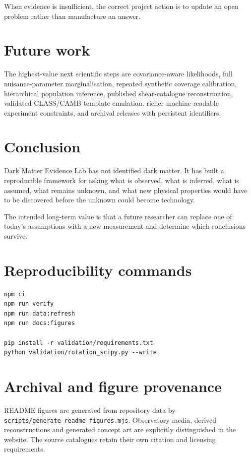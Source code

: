 \documentclass[11pt,a4paper]{article}
\begin{document}
When evidence is insufficient, the correct project action is to update an open problem rather than manufacture an answer.

\section{Future work}
The highest-value next scientific steps are covariance-aware likelihoods, full nuisance-parameter marginalisation, repeated synthetic coverage calibration, hierarchical population inference, published shear-catalogue reconstruction, validated CLASS/CAMB template emulation, richer machine-readable experiment constraints, and archival releases with persistent identifiers.

\section{Conclusion}
Dark Matter Evidence Lab has not identified dark matter. It has built a reproducible framework for asking what is observed, what is inferred, what is assumed, what remains unknown, and what new physical properties would have to be discovered before the unknown could become technology.

The intended long-term value is that a future researcher can replace one of today's assumptions with a new measurement and determine which conclusions survive.

\appendix
\section{Reproducibility commands}
\begin{verbatim}
npm ci
npm run verify
npm run data:refresh
npm run docs:figures

pip install -r validation/requirements.txt
python validation/rotation_scipy.py --write
\end{verbatim}

\section{Archival and figure provenance}
README figures are generated from repository data by \texttt{scripts/generate\_readme\_figures.mjs}. Observatory media, derived reconstructions and generated concept art are explicitly distinguished in the website. The source catalogues retain their own citation and licensing requirements.

\printbibliography
\end{document}
